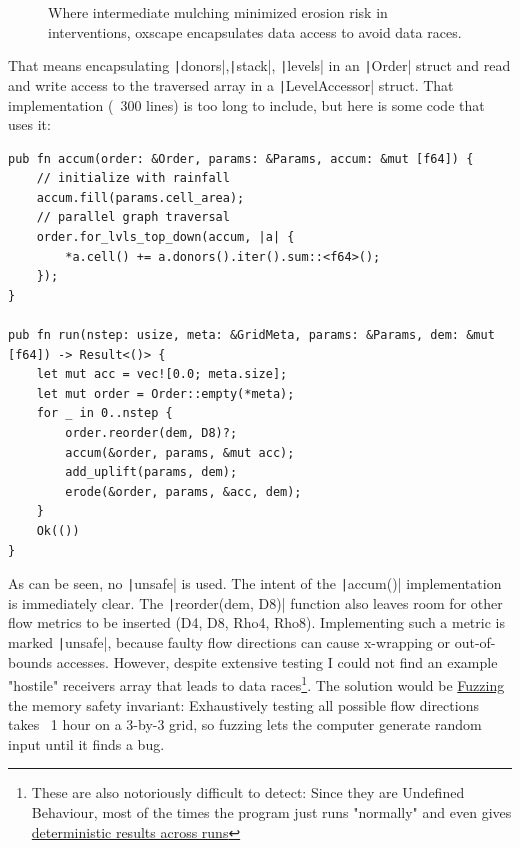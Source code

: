 \documentclass[a4paper]{article} %
\begin{document}
\begin{figure}
    \begin{center}
        
    \end{center}
    \caption{Where intermediate mulching minimized erosion risk in interventions, oxscape encapsulates data access to avoid data races.}
    \label{fig:oxscape}
\end{figure}

That means encapsulating \texttt|donors|,\texttt|stack|, \texttt|levels| in an \texttt|Order| struct and read and write access to the traversed array in a \texttt|LevelAccessor| struct. That implementation (~300 lines) is too long to include, but here is some code that uses it:

\begin{verbatim}
pub fn accum(order: &Order, params: &Params, accum: &mut [f64]) {
    // initialize with rainfall
    accum.fill(params.cell_area);
    // parallel graph traversal
    order.for_lvls_top_down(accum, |a| {
        *a.cell() += a.donors().iter().sum::<f64>();
    });
}

pub fn run(nstep: usize, meta: &GridMeta, params: &Params, dem: &mut [f64]) -> Result<()> {
    let mut acc = vec![0.0; meta.size];
    let mut order = Order::empty(*meta);
    for _ in 0..nstep {
        order.reorder(dem, D8)?;
        accum(&order, params, &mut acc);
        add_uplift(params, dem);
        erode(&order, params, &acc, dem);
    }
    Ok(())
}
\end{verbatim}

As can be seen, no \texttt|unsafe| is used. The intent of the \texttt|accum()| implementation is immediately clear. The \texttt|reorder(dem, D8)| function also leaves room for other flow metrics to be inserted (D4, D8, Rho4, Rho8). Implementing such a metric is marked \texttt|unsafe|, because faulty flow directions can cause x-wrapping or out-of-bounds accesses. However, despite extensive testing I could not find an example "hostile" receivers array that leads to data races\footnote{These are also notoriously difficult to detect: Since they are Undefined Behaviour, most of the times the program just runs "normally" and even gives \href{https://codeberg.org/feefladder/oxscape/src/commit/f4fc4f79f33f0d8884785b548849e701a37eb836/playground/src/lib.rs\#L137}{deterministic results across runs}}. The solution would be \href{https://rust-fuzz.github.io/book/cargo-fuzz/structure-aware-fuzzing.html}{Fuzzing}\cite{goregaokarMitigatingUnderhandednessFuzzing2017} the memory safety invariant: Exhaustively testing all possible flow directions takes ~1 hour on a 3-by-3 grid, so fuzzing lets the computer generate random input until it finds a bug.
\end{document}
